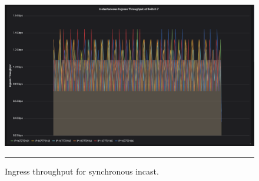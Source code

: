 \begin{figure}[htbp]
	\centering
		\includegraphics[width=1.0\columnwidth]{Figures/ingress_sync.png}
		\rule{35em}{0.5pt}
	\caption[Ingress Throughput for Synchronous Incast]{Ingress throughput for synchronous incast.}
	\label{fig:ing_sync}
\end{figure}

